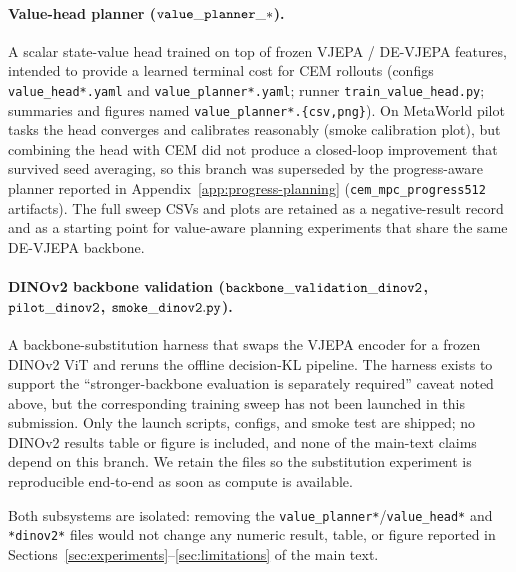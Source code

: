 \documentclass[10pt,twocolumn]{article}
\theoremstyle{tightstyle}
\begin{document}
\paragraph{Value-head planner ($\tt value\_planner\_*$).} A scalar
state-value head trained on top of frozen VJEPA / DE-VJEPA features, intended
to provide a learned terminal cost for CEM rollouts (configs
\texttt{value\_head*.yaml} and \texttt{value\_planner*.yaml}; runner
\texttt{train\_value\_head.py}; summaries and figures named
\texttt{value\_planner*.\{csv,png\}}). On MetaWorld pilot tasks the head
converges and calibrates reasonably (smoke calibration plot), but combining
the head with CEM did not produce a closed-loop improvement that survived
seed averaging, so this branch was superseded by the progress-aware planner
reported in Appendix~\ref{app:progress-planning} (\texttt{cem\_mpc\_progress512}
artifacts). The full sweep CSVs and plots are retained as a negative-result
record and as a starting point for value-aware planning experiments that
share the same DE-VJEPA backbone.

\paragraph{DINOv2 backbone validation
($\tt backbone\_validation\_dinov2$, $\tt pilot\_dinov2$,
$\tt smoke\_dinov2.py$).} A backbone-substitution harness that swaps the
VJEPA encoder for a frozen DINOv2 ViT and reruns the offline decision-KL
pipeline. The harness exists to support the ``stronger-backbone evaluation
is separately required'' caveat noted above, but the corresponding training
sweep has not been launched in this submission. Only the launch scripts,
configs, and smoke test are shipped; no DINOv2 results table or figure is
included, and none of the main-text claims depend on this branch. We retain
the files so the substitution experiment is reproducible end-to-end as soon
as compute is available.

Both subsystems are isolated: removing the
\texttt{value\_planner*}/\texttt{value\_head*} and \texttt{*dinov2*} files
would not change any numeric result, table, or figure reported in
Sections~\ref{sec:experiments}--\ref{sec:limitations} of the main text.
\end{document}
